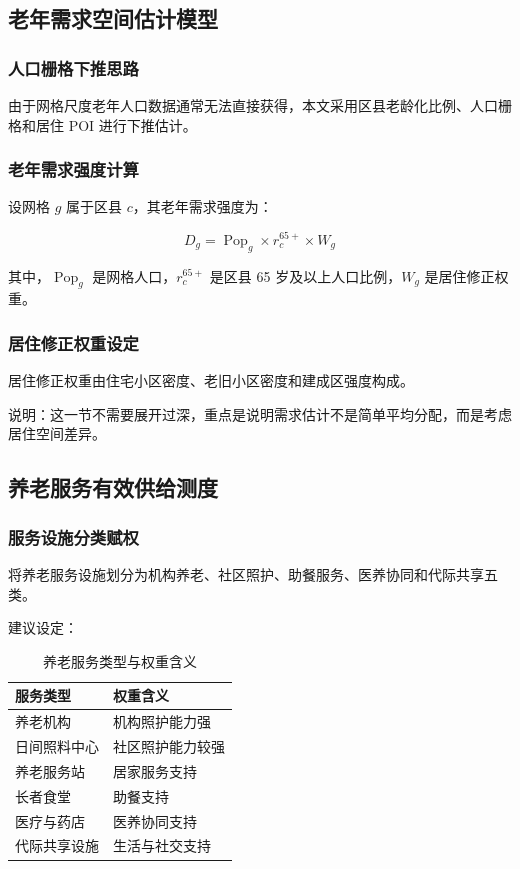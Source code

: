 \documentclass[UTF8,zihao=-4,a4paper,fontset=none]{ctexart}
\begin{document}
\subsection{老年需求空间估计模型}

\subsubsection{人口栅格下推思路}

由于网格尺度老年人口数据通常无法直接获得，本文采用区县老龄化比例、人口栅格和居住 POI 进行下推估计。

\subsubsection{老年需求强度计算}

设网格 $g$ 属于区县 $c$，其老年需求强度为：

\begin{equation}
D_g = \operatorname{Pop}_g \times r_c^{65+} \times W_g
\end{equation}

其中，$\operatorname{Pop}_g$ 是网格人口，$r_c^{65+}$ 是区县 65 岁及以上人口比例，$W_g$ 是居住修正权重。

\subsubsection{居住修正权重设定}

居住修正权重由住宅小区密度、老旧小区密度和建成区强度构成。

说明：这一节不需要展开过深，重点是说明需求估计不是简单平均分配，而是考虑居住空间差异。

\subsection{养老服务有效供给测度}

\subsubsection{服务设施分类赋权}

将养老服务设施划分为机构养老、社区照护、助餐服务、医养协同和代际共享五类。

建议设定：

\begin{table}[H]
\centering
\caption{养老服务类型与权重含义}
\begin{tabular}{ll}
\toprule
\rowcolor{tablehead}
服务类型 & 权重含义 \\
\midrule
养老机构 & 机构照护能力强 \\
日间照料中心 & 社区照护能力较强 \\
养老服务站 & 居家服务支持 \\
长者食堂 & 助餐支持 \\
医疗与药店 & 医养协同支持 \\
代际共享设施 & 生活与社交支持 \\
\bottomrule
\end{tabular}
\end{table}
\end{document}
